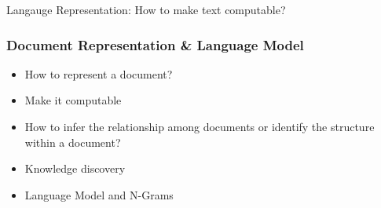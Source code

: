 
\begin{frame}
  \begin{center}
    {\Large Langauge Representation: How to make text computable?}
  \end{center}
\end{frame}


\begin{frame}[fragile]\frametitle{Document Representation \& Language Model}
\begin{itemize}
\item How to represent a document?
\item Make it computable
\item How to infer the relationship among documents or identify the structure within a document?
\item Knowledge discovery
\item Language Model and N-Grams

\end{itemize}
\end{frame}


